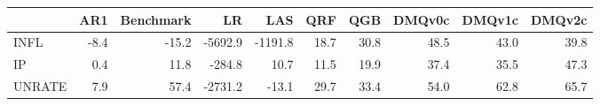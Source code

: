 \begin{tabular}{lrrrrrrrrr}
\toprule
 & AR1 & Benchmark & LR & LAS & QRF & QGB & DMQv0c & DMQv1c & DMQv2c \\
\midrule
INFL & -8.4 & -15.2 & -5692.9 & -1191.8 & 18.7 & 30.8 & 48.5 & 43.0 & 39.8 \\
IP & 0.4 & 11.8 & -284.8 & 10.7 & 11.5 & 19.9 & 37.4 & 35.5 & 47.3 \\
UNRATE & 7.9 & 57.4 & -2731.2 & -13.1 & 29.7 & 33.4 & 54.0 & 62.8 & 65.7 \\
\bottomrule
\end{tabular}
